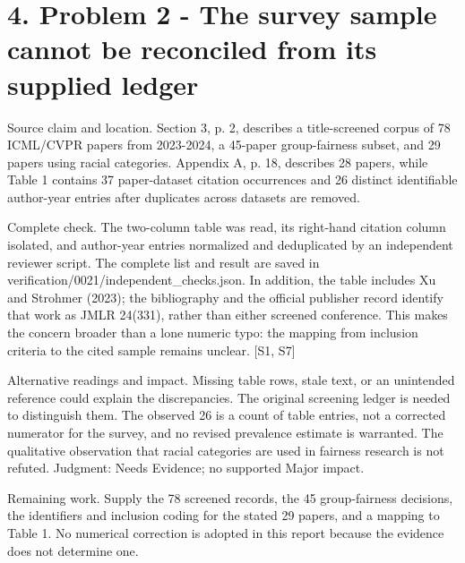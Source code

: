 \documentclass[10pt]{article}
\begin{document}
\section*{4. Problem 2 - The survey sample cannot be reconciled from its supplied ledger}
Source claim and location. Section 3, p. 2, describes a title-screened corpus of 78 ICML/CVPR papers from 2023-2024, a 45-paper group-fairness subset, and 29 papers using racial categories. Appendix A, p. 18, describes 28 papers, while Table 1 contains 37 paper-dataset citation occurrences and 26 distinct identifiable author-year entries after duplicates across datasets are removed.\par
Complete check. The two-column table was read, its right-hand citation column isolated, and author-year entries normalized and deduplicated by an independent reviewer script. The complete list and result are saved in verification/0021/independent\_checks.json. In addition, the table includes Xu and Strohmer (2023); the bibliography and the official publisher record identify that work as JMLR 24(331), rather than either screened conference. This makes the concern broader than a lone numeric typo: the mapping from inclusion criteria to the cited sample remains unclear. [S1, S7]\par
Alternative readings and impact. Missing table rows, stale text, or an unintended reference could explain the discrepancies. The original screening ledger is needed to distinguish them. The observed 26 is a count of table entries, not a corrected numerator for the survey, and no revised prevalence estimate is warranted. The qualitative observation that racial categories are used in fairness research is not refuted. Judgment: Needs Evidence; no supported Major impact.\par
Remaining work. Supply the 78 screened records, the 45 group-fairness decisions, the identifiers and inclusion coding for the stated 29 papers, and a mapping to Table 1. No numerical correction is adopted in this report because the evidence does not determine one.\par
\end{document}
